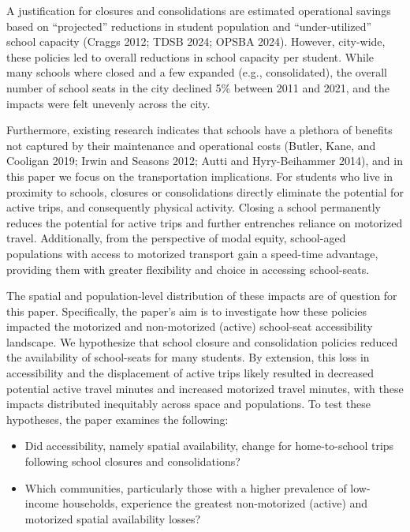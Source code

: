 \documentclass[
default
]{sn-jnl}
\providecommand{\tightlist}{%
  \setlength{\itemsep}{0pt}\setlength{\parskip}{0pt}}\usepackage{longtable,booktabs,array}
\begin{document}
A justification for closures and consolidations are estimated
operational savings based on ``projected'' reductions in student
population and ``under-utilized'' school capacity (Craggs 2012; TDSB
2024; OPSBA 2024). However, city-wide, these policies led to overall
reductions in school capacity per student. While many schools where
closed and a few expanded (e.g., consolidated), the overall number of
school seats in the city declined 5\% between 2011 and 2021, and the
impacts were felt unevenly across the city.

Furthermore, existing research indicates that schools have a plethora of
benefits not captured by their maintenance and operational costs
(Butler, Kane, and Cooligan 2019; Irwin and Seasons 2012; Autti and
Hyry-Beihammer 2014), and in this paper we focus on the transportation
implications. For students who live in proximity to schools, closures or
consolidations directly eliminate the potential for active trips, and
consequently physical activity. Closing a school permanently reduces the
potential for active trips and further entrenches reliance on motorized
travel. Additionally, from the perspective of modal equity, school-aged
populations with access to motorized transport gain a speed-time
advantage, providing them with greater flexibility and choice in
accessing school-seats.

The spatial and population-level distribution of these impacts are of
question for this paper. Specifically, the paper's aim is to investigate
how these policies impacted the motorized and non-motorized (active)
school-seat accessibility landscape. We hypothesize that school closure
and consolidation policies reduced the availability of school-seats for
many students. By extension, this loss in accessibility and the
displacement of active trips likely resulted in decreased potential
active travel minutes and increased motorized travel minutes, with these
impacts distributed inequitably across space and populations. To test
these hypotheses, the paper examines the following:

\begin{itemize}
\tightlist
\item
  Did accessibility, namely spatial availability, change for
  home-to-school trips following school closures and consolidations?
\item
  Which communities, particularly those with a higher prevalence of
  low-income households, experience the greatest non-motorized (active)
  and motorized spatial availability losses?
\end{itemize}
\end{document}
